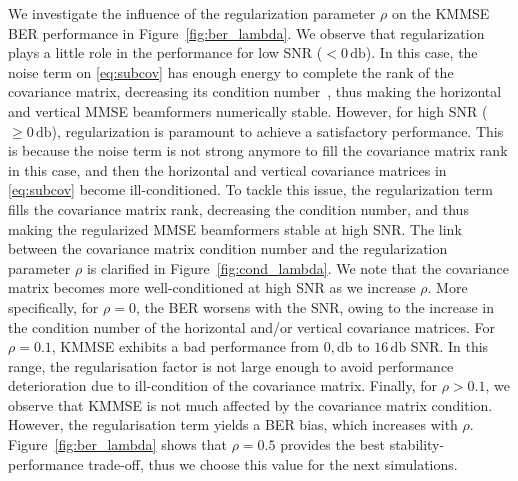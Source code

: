 \documentclass{cta-author}
\begin{document}
We investigate the influence of the regularization parameter $\rho$ on the KMMSE BER performance in Figure~\ref{fig:ber_lambda}. We observe that regularization plays a little role in the performance for low SNR ($< 0\,\si{\decibel}$). In this case, the noise term on \eqref{eq:subcov} has enough energy to complete the rank of the covariance matrix, decreasing its condition number~\cite{golub2012matrix}, thus making the horizontal and vertical MMSE beamformers numerically stable. However, for high SNR ($\geq 0\,\si{\decibel}$), regularization is paramount to achieve a satisfactory performance. This is because the noise term is not strong anymore to fill the covariance matrix rank in this case, and then the horizontal and vertical covariance matrices in \eqref{eq:subcov} become ill-conditioned. To tackle this issue, the regularization term fills the covariance matrix rank, decreasing the condition number, and thus making the regularized MMSE beamformers stable at high SNR. The link between the covariance matrix condition number and the regularization parameter $\rho$ is clarified in Figure~\ref{fig:cond_lambda}. We note that the covariance matrix becomes more well-conditioned at high SNR as we increase $\rho$. More specifically, for $\rho = 0$, the BER worsens with the SNR, owing to the increase in the condition number of the horizontal and/or vertical covariance matrices. For $\rho=0.1$, KMMSE exhibits a bad performance from $0,\si{\decibel}$ to $16\,\si{\decibel}$ SNR. In this range, the regularisation factor is not large enough to avoid performance deterioration due to ill-condition of the covariance matrix. Finally, for $\rho > 0.1$, we observe that KMMSE is not much affected by the covariance matrix condition. However, the regularisation term yields a BER bias, which increases with $\rho$. Figure~\ref{fig:ber_lambda} shows that $\rho=0.5$ provides the best stability-performance trade-off, thus we choose this value for the next simulations.
\end{document}
